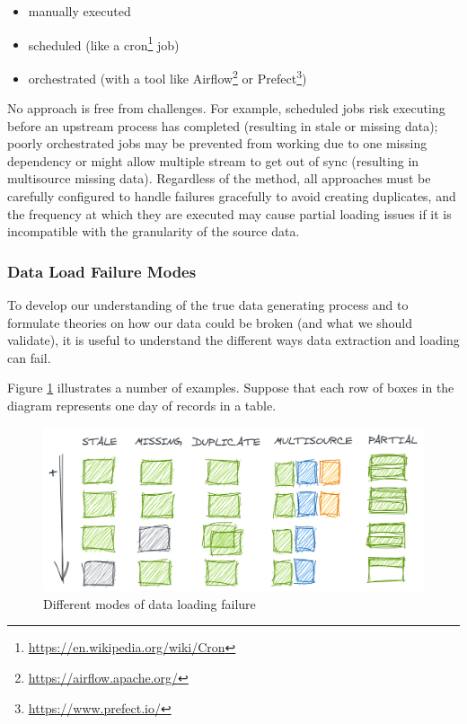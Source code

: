 \documentclass[
]{krantz}
\providecommand{\tightlist}{%
  \setlength{\itemsep}{0pt}\setlength{\parskip}{0pt}}
\renewcommand{\href}[2]{#2\footnote{\url{#1}}}
\begin{document}
\begin{itemize}
\tightlist
\item
  manually executed
\item
  scheduled (like a \href{https://en.wikipedia.org/wiki/Cron}{cron} job)
\item
  orchestrated (with a tool like \href{https://airflow.apache.org/}{Airflow} or \href{https://www.prefect.io/}{Prefect})
\end{itemize}

No approach is free from challenges.
For example, scheduled jobs risk executing before an upstream process has completed (resulting in stale or missing data);
poorly orchestrated jobs may be prevented from working due to one missing dependency or might allow multiple stream to get out of sync (resulting in multisource missing data).
Regardless of the method, all approaches must be carefully configured to handle failures gracefully to avoid creating duplicates, and the frequency at which they are executed may cause partial loading issues if it is incompatible with the granularity of the source data.

\hypertarget{data-load-failure-modes}{%
\subsubsection{Data Load Failure Modes}\label{data-load-failure-modes}}

To develop our understanding of the true data generating process and to formulate theories on how our data could be broken (and what we should validate), it is useful to understand the different ways data extraction and loading can fail.

Figure \ref{fig:data-load} illustrates a number of examples. Suppose that each row of boxes in the diagram represents one day of records in a table.

\begin{figure}

{\centering \includegraphics[width=0.9\linewidth]{figures/data-dall/data-load} 

}

\caption{Different modes of data loading failure}\label{fig:data-load}
\end{figure}
\end{document}
